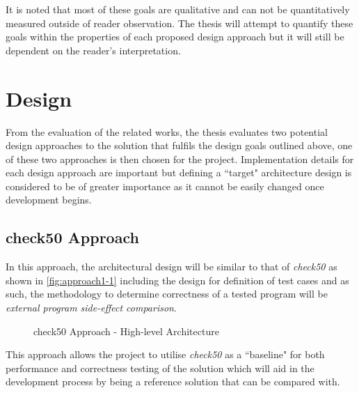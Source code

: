 \documentclass[hidelinks]{report}
\begin{document}
It is noted that most of these goals are qualitative and can not be quantitatively measured outside of reader observation. The thesis will attempt to quantify these goals within the properties of each proposed design approach but it will still be dependent on the reader's interpretation.

\clearpage
\section{Design}

From the evaluation of the related works, the thesis evaluates two potential design approaches to the solution that fulfils the design goals outlined above, one of these two approaches is then chosen for the project. Implementation details for each design approach are important but defining a ``target" architecture design is considered to be of greater importance as it cannot be easily changed once development begins.

\subsection{check50 Approach}\label{check50Approach}

In this approach, the architectural design will be similar to that of \textit{check50} as shown in \autoref{fig:approach1-1} including the design for definition of test cases and as such, the methodology to determine correctness of a tested program will be \textit{external program side-effect comparison}.

\begin{figure}[h]
	\centering
	\caption{check50 Approach - High-level Architecture}
	\label{fig:approach1-1}
\end{figure}

This approach allows the project to utilise \textit{check50} as a ``baseline" for both performance and correctness testing of the solution which will aid in the development process by being a reference solution that can be compared with.
\end{document}
